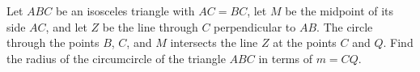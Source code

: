 Let $ABC$ be an isosceles triangle with $AC=BC$, let $M$ be the midpoint of its side $AC$, and let $Z$ be the line through $C$ perpendicular to $AB$. The circle through the points $B$, $C$, and $M$ intersects the line $Z$ at the points $C$ and $Q$. Find the radius of the circumcircle of the triangle $ABC$ in terms of $m = CQ$.
